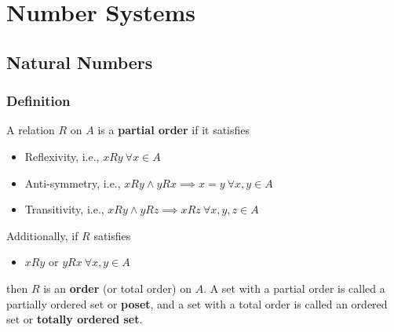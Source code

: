 \section{Number Systems}

\subsection{Natural Numbers}

\subsubsection{Definition}
\begin{true}
A relation $R$ on $A$ is a \textbf{partial order} if it satisfies
\begin{itemize}
    \item Reflexivity, i.e., $xRy \ \forall x \in A$
    \item Anti-symmetry, i.e., $xRy \land yRx \implies x = y \ \forall x,y \in A$
    \item Transitivity, i.e., $xRy \land yRz \implies xRz \ \forall x,y,z \in A$
\end{itemize}
Additionally, if $R$ satisfies
\begin{itemize}
    \item $xRy$ or $yRx \ \forall x,y \in A$
\end{itemize}
then $R$ is an \textbf{order} (or total order) on $A$. A set with a partial order is called a partially ordered set or \textbf{poset}, and a set with a total order is called an ordered set or \textbf{totally ordered set}.
\end{true}
